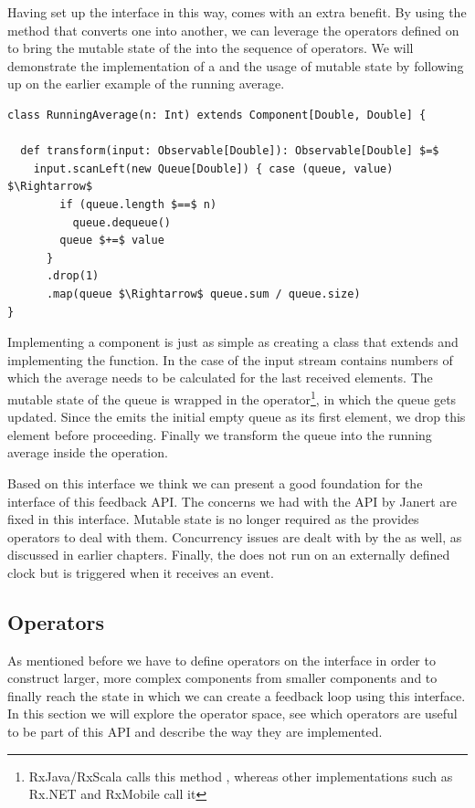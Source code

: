 Having set up the \comp interface in this way, comes with an extra benefit. By using the  method that converts one \obs into another, we can leverage the operators defined on \obs to bring the mutable state of the \comp into the sequence of operators. We will demonstrate the implementation of a \comp and the usage of mutable state by following up on the earlier example of the running average.

\begin{minipage}{\linewidth}
\begin{lstlisting}[style=ScalaStyle, caption={Implementation of \code{RunningAverage} using the \comp interface}, label={lst:running-average-final}]
class RunningAverage(n: Int) extends Component[Double, Double] {

  def transform(input: Observable[Double]): Observable[Double] $=$
    input.scanLeft(new Queue[Double]) { case (queue, value) $\Rightarrow$ 
        if (queue.length $==$ n)
          queue.dequeue()
        queue $+=$ value
      }
      .drop(1)
      .map(queue $\Rightarrow$ queue.sum / queue.size)
}
\end{lstlisting}
\end{minipage}

Implementing a component is just as simple as creating a class that extends \comp and implementing the  function. In the case of  the input stream contains numbers of which the average needs to be calculated for the last  received elements. The mutable state of the queue is wrapped in the  operator\footnote{RxJava/RxScala calls this method , whereas other implementations such as Rx.NET and RxMobile call it }, in which the queue gets updated. Since the  emits the initial empty queue as its first element, we drop this element before proceeding. Finally we transform the queue into the running average inside the  operation.

Based on this interface we think we can present a good foundation for the interface of this feedback API. The concerns we had with the API by Janert are fixed in this interface. Mutable state is no longer required as the \obs provides operators to deal with them. Concurrency issues are dealt with by the \obs as well, as discussed in earlier chapters. Finally, the \comp does not run on an externally defined clock but is triggered when it receives an event.

\subsection{Operators}
As mentioned before we have to define operators on the \comp interface in order to construct larger, more complex components from smaller components and to finally reach the state in which we can create a feedback loop using this interface. In this section we will explore the operator space, see which operators are useful to be part of this API and describe the way they are implemented.

